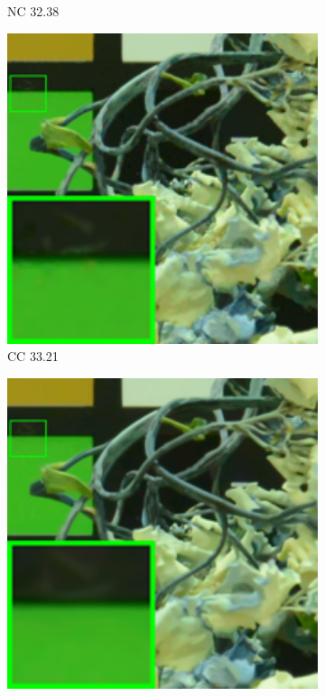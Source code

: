 \begin{figure}
\begin{subfigure}[t]{0.19\textwidth}
		\caption{NC 32.38}
    \end{subfigure}
    \hfill
    \begin{subfigure}[t]{0.19\textwidth}
        \centering
        \includegraphics[width=1\textwidth]{images/mcwnnm/cc/resize_br_CC_d800_iso6400_2.png}
		\caption{CC 33.21}
    \end{subfigure}
    \hfill
    \begin{subfigure}[t]{0.19\textwidth}
        \centering
        \includegraphics[width=1\textwidth]{images/mcwnnm/cc/resize_br_WNNMJ_CC15_d800_iso6400_2.png}

\end{subfigure}
\end{figure}
